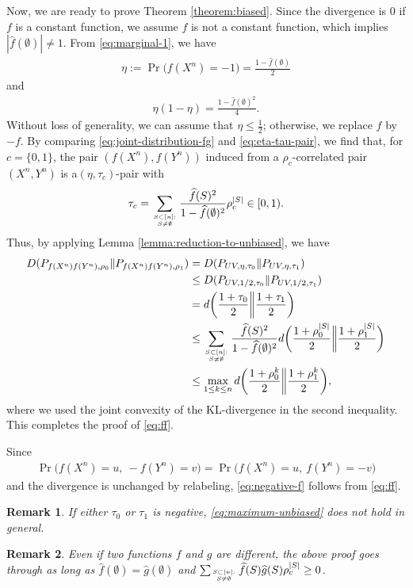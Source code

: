 \documentclass[journal,draftcls, onecolumn]{IEEEtran}
\newtheorem{remark}{Remark}
\newcommand{\qed}{\hfill \IEEEQED}
\begin{document}
Now, we are ready to prove Theorem \ref{theorem:biased}. 
Since the divergence is $0$ if $f$ is a constant function, we assume $f$ is not a constant function, which
implies $|\widehat{f}(\emptyset)| \neq 1$.
From \eqref{eq:marginal-1}, we have
\begin{align*}
\eta := \Pr\big( f(X^n)=-1) = \frac{1- \widehat{f}(\emptyset)}{2}
\end{align*}
and 
\begin{align*}
\eta(1-\eta) = \frac{1-\widehat{f}(\emptyset)^2}{4}.
\end{align*}
Without loss of generality, we can assume that $\eta \le \frac{1}{2}$; otherwise, we replace $f$ by $-f$.
By comparing \eqref{eq:joint-distribution-fg} and \eqref{eq:eta-tau-pair}, we find that, for $c= \{0,1\}$, 
the pair $(f(X^n),f(Y^n))$ induced from a $\rho_c$-correlated pair $(X^n,Y^n)$ is a$(\eta,\tau_c)$-pair with
\begin{align*}
\tau_c = \sum_{S\subset [n]:\atop S \neq \emptyset} \frac{  \widehat{f}(S)^2}{1- \widehat{f}(\emptyset)^2} \rho_c^{|S|}  \in [0,1).
\end{align*}
Thus, by applying Lemma \ref{lemma:reduction-to-unbiased}, we have
\begin{align*}
D( P_{f(X^n)f(Y^n),\rho_0} \| P_{f(X^n)f(Y^n),\rho_1})
&= D(P_{UV,\eta,\tau_0} \| P_{UV,\eta,\tau_1}) \\
&\le D(P_{UV,1/2,\tau_0} \| P_{UV,1/2,\tau_1}) \\
&= d\bigg(\frac{1+\tau_0}{2} \bigg\| \frac{1+\tau_1}{2}\bigg) \\
&\le \sum_{S \subset [n]:\atop S \neq \emptyset} \frac{ \widehat{f}(S)^2}{1- \widehat{f}(\emptyset)^2} 
d\bigg( \frac{1+\rho_0^{|S|}}{2} \bigg\| \frac{1+\rho_1^{|S|}}{2} \bigg) \\
&\le \max_{1 \le k \le n} d\bigg( \frac{1+\rho_0^k}{2} \bigg\| \frac{1+\rho_1^k}{2}\bigg),
\end{align*}
where we used the joint convexity of the KL-divergence in the second inequality. 
This completes the proof of \eqref{eq:ff}. 

Since
\begin{align*}
\Pr\big( f(X^n) = u,~-f(Y^n)=v \big) = \Pr\big( f(X^n) = u,~f(Y^n)=-v \big)
\end{align*}
and the divergence is unchanged by relabeling, \eqref{eq:negative-f} follows from \eqref{eq:ff}.
\qed


\begin{remark}
If either $\tau_0$ or $\tau_1$ is negative, \eqref{eq:maximum-unbiased} does not hold in general.
\end{remark}
\begin{remark}
Even if two functions $f$ and $g$ are different, the above proof goes through as long as 
$\widehat{f}(\emptyset)=\widehat{g}(\emptyset)$ and $\sum_{S\subset[n]:\atop S\neq\emptyset} \widehat{f}(S)\widehat{g}(S)\rho_c^{|S|}\ge0$.
\end{remark}
\end{document}
